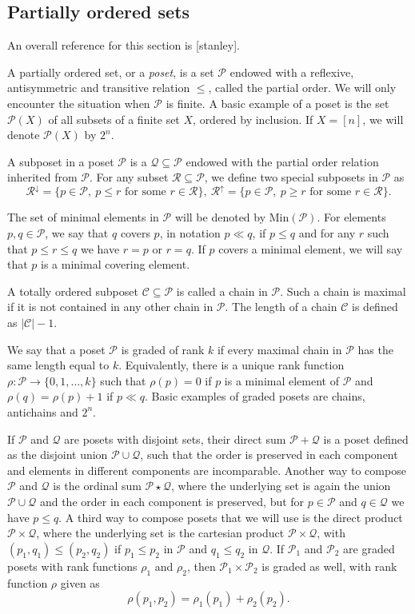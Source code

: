 \documentclass[12pt]{article}
\theoremstyle{definition}
\theoremstyle{remark}
\def\cover{\ll}
\def\Ce{\mathcal C}
\def\Pe{\mathcal P}
\begin{document}
\subsection{Partially ordered sets}\label{app:poset}

An overall reference for this section is [stanley].


A partially ordered set, or a {\em poset}, is a set $\Pe$ endowed with a reflexive, antisymmetric and
transitive relation $\le$, called the partial order. We will only encounter  the situation
when $\Pe$ is finite. A basic example of a poset is the set $\Pe(X)$ of all subsets of a
finite set $X$, ordered by inclusion. If $X=[n]$, we will denote $\Pe(X)$ by $2^n$. 

A subposet in a poset $\Pe$ is a $\mathcal Q\subseteq \Pe$ endowed with the partial order
relation inherited from $\Pe$. For any subset $\mathcal R\subseteq \Pe$, we define two
special 
subposets in $\Pe$ as
\[
\mathcal R^\downarrow=\{p\in \Pe,\ p\le r \text{ for some } r\in \mathcal R\}, \ \mathcal
R^\uparrow=\{p\in \Pe,\ p\ge  r \text{ for some } r\in \mathcal R\}.
\]

The set of minimal elements in $\Pe$ will be denoted by $\mathrm{Min}(\Pe)$. 
For elements $p,q\in \Pe$, we say that $q$ covers $p$, in notation $p\cover q$,  if $p\le q$
and for any $r$ such that $p\le r\le q$ we have $r=p$ or $r=q$. If $p$ covers a minimal
element, we will say that $p$ is a minimal covering element.


A totally ordered subposet $\Ce\subseteq \Pe$ is called a chain in $\Pe$. Such a chain  is
maximal if it is not contained in any other chain in $\Pe$.
The length of a chain $\Ce$ is defined as $|\Ce|-1$. 

We say that a poset $\Pe$  is graded of rank
$k$ if every maximal chain in $\Pe$ has the same length equal to $k$. Equivalently,  there is
a unique rank function $\rho: \Pe\to \{0,1,\dots,k\}$ such that $\rho(p)=0$ if $p$ is a
minimal element of $\Pe$ and $\rho(q)=\rho(p)+1$ if $p\cover q$. Basic examples of graded
posets are chains, antichains and $2^n$.


If $\Pe$ and $\mathcal Q$ are posets with disjoint sets, their direct sum $\Pe+\mathcal Q$ is a poset defined as 
the disjoint union $\Pe\cup \mathcal Q$, such that the order is preserved in each
component and elements in different components are incomparable. 
 Another way to compose
$\Pe$ and $\mathcal Q$ is the ordinal sum $\Pe\star \mathcal Q$, where the underlying set
is again the union $\Pe\cup \mathcal Q$ and the order in each component is preserved, but
for $p\in \Pe$ and $q\in \mathcal Q$ we have $p\le q$. A third way to compose posets that
we will use is the direct product $\Pe\times \mathcal Q$, where the underlying set is the
cartesian product $\Pe\times \mathcal Q$, with $(p_1,q_1)\le (p_2,q_2)$ if $p_1\le p_2$ in
$\Pe$  and $q_1\le q_2$ in $\mathcal Q$.
If $\Pe_1$ and $\Pe_2$ are graded posets with rank functions $\rho_1$ and $\rho_2$, then 
$\Pe_1\times \Pe_2$ is graded as well, with rank function $\rho$ given as
\[
\rho(p_1,p_2)=\rho_1(p_1)+\rho_2(p_2).
\]
\end{document}
